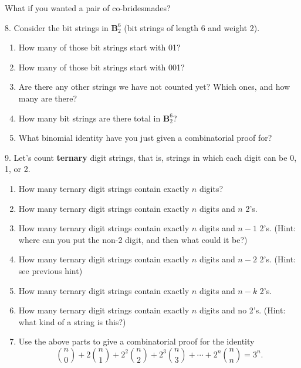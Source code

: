 \documentclass[10pt,]{book}
\newcommand{\terminology}[1]{\textbf{#1}}
\theoremstyle{plain}
\theoremstyle{definition}
\numberwithin{equation}{chapter}
\def\B{\mathbf{B}}
\begin{document}
\begin{exerciselist}
          What if you wanted a pair of co-bridesmades?
\item[8.]\hypertarget{exercise-90}{}
          Consider the bit strings in \(\B^6_2\) (bit strings of length 6 and weight 2).
        \leavevmode%
\begin{enumerate}[label=(\alph*)]
\item\hypertarget{li-303}{} How many of those bit strings start with 01? %
\item\hypertarget{li-304}{} How many of those bit strings start with 001? %
\item\hypertarget{li-305}{} Are there any other strings we have not counted yet?  Which ones, and how many are there? %
\item\hypertarget{li-306}{} How many bit strings are there total in \(\B^6_2\)? %
\item\hypertarget{li-307}{} What binomial identity have you just given a combinatorial proof for? %
\end{enumerate}

\par\smallskip
\item[9.]\hypertarget{exercise-91}{}
          Let's count \terminology{ternary} digit strings, that is, strings in which each digit can be 0, 1, or 2.
        \leavevmode%
\begin{enumerate}[label=(\alph*)]
\item\hypertarget{li-308}{} How many ternary digit strings contain exactly \(n\) digits? %
\item\hypertarget{li-309}{} How many ternary digit strings contain exactly \(n\) digits and \(n\) 2's. %
\item\hypertarget{li-310}{} How many ternary digit strings contain exactly \(n\) digits and \(n-1\) 2's.  (Hint: where can you put the non-2 digit, and then what could it be?) %
\item\hypertarget{li-311}{} How many ternary digit strings contain exactly \(n\) digits and \(n-2\) 2's.  (Hint: see previous hint) %
\item\hypertarget{li-312}{} How many ternary digit strings contain exactly \(n\) digits and \(n-k\) 2's. %
\item\hypertarget{li-313}{} How many ternary digit strings contain exactly \(n\) digits and no 2's. (Hint: what kind of a string is this?) %
\item\hypertarget{li-314}{} Use the above parts to give a combinatorial proof for the identity \begin{equation*} {n \choose 0} + 2{n \choose 1} + 2^2{n \choose 2} + 2^3{n \choose 3} + \cdots + 2^n{n \choose n} = 3^n. \end{equation*} %
\end{enumerate}


\end{exerciselist}
\end{document}
